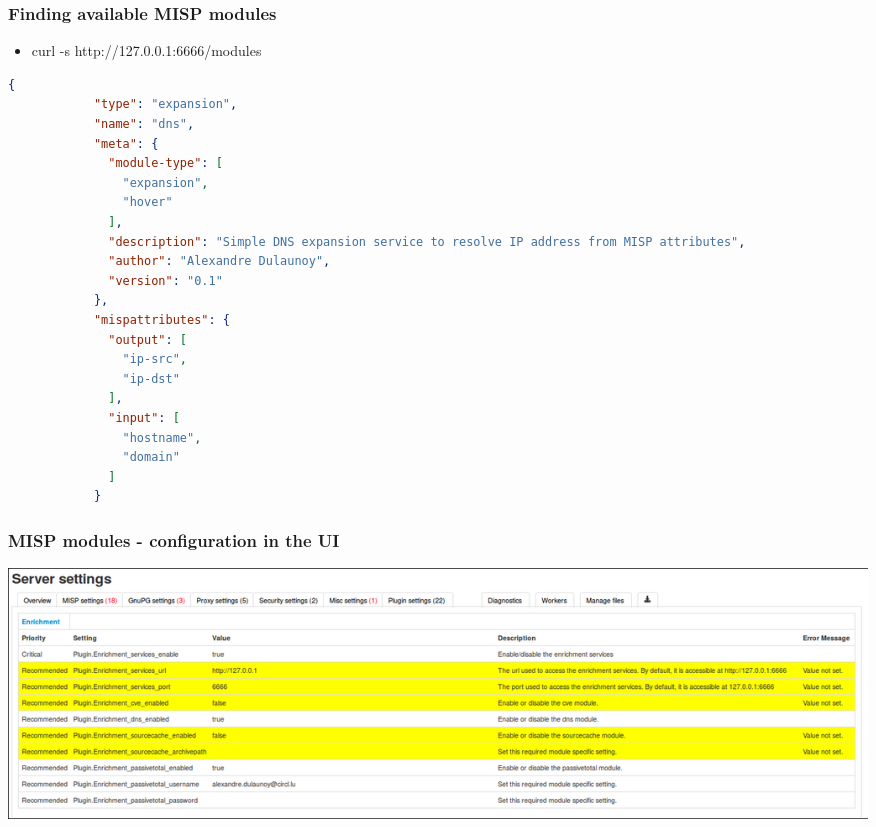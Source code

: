 \begin{frame}[fragile]
        \frametitle{Finding available MISP modules}
        \begin{itemize}
                \item curl -s http://127.0.0.1:6666/modules
        \end{itemize}
        \begin{adjustbox}{width=\textwidth,height=6cm,keepaspectratio}
        \begin{lstlisting}[language=json,firstnumber=1]
            {
            "type": "expansion",
            "name": "dns",
            "meta": {
              "module-type": [
                "expansion",
                "hover"
              ],
              "description": "Simple DNS expansion service to resolve IP address from MISP attributes",
              "author": "Alexandre Dulaunoy",
              "version": "0.1"
            },
            "mispattributes": {
              "output": [
                "ip-src",
                "ip-dst"
              ],
              "input": [
                "hostname",
                "domain"
              ]
            }
        \end{lstlisting}
        \end{adjustbox}
\end{frame}

\begin{frame}
        \frametitle{MISP modules - configuration in the UI}
        \includegraphics[scale=0.50]{modules-integration.png}
\end{frame}

